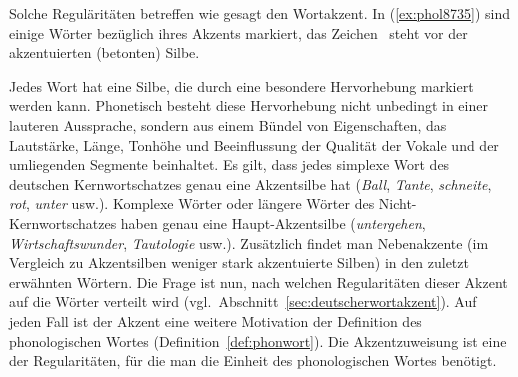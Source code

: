 Solche Reguläritäten betreffen wie gesagt den Wortakzent.
In (\ref{ex:phol8735}) sind einige Wörter bezüglich ihres Akzents markiert, das Zeichen \Akz\ steht vor der akzentuierten (betonten) Silbe.

\begin{exe}
  \ex\label{ex:phol8735}
  \begin{xlist}
  \end{xlist}
\end{exe}

Jedes Wort hat eine Silbe, die durch eine besondere Hervorhebung markiert werden kann.
Phonetisch besteht diese Hervorhebung nicht unbedingt in einer lauteren Aussprache, sondern aus einem Bündel von Eigenschaften, das Lautstärke, Länge, Tonhöhe und Beeinflussung der Qualität der Vokale und der umliegenden Segmente beinhaltet.
Es gilt, dass jedes simplexe Wort des deutschen Kernwortschatzes genau eine Akzentsilbe hat (\textit{\Akz Ball}, \textit{\Akz Tante}, \textit{\Akz schneite}, \textit{\Akz rot}, \textit{\Akz unter} usw.).
Komplexe Wörter oder längere Wörter des Nicht-Kernwortschatzes haben genau eine Haupt-Akzentsilbe (\textit{\Akz untergehen}, \textit{\Akz Wirtschaftswunder}, \textit{Tautolo\Akz gie} usw.).
Zusätzlich findet man Nebenakzente (im Vergleich zu Akzentsilben weniger stark akzentuierte Silben) in den zuletzt erwähnten Wörtern.
Die Frage ist nun, nach welchen Regularitäten dieser Akzent auf die Wörter verteilt wird (vgl.\ Abschnitt~\ref{sec:deutscherwortakzent}).
Auf jeden Fall ist der Akzent eine weitere Motivation der Definition des phonologischen Wortes (Definition~\ref{def:phonwort}).
Die Akzentzuweisung ist eine der Regularitäten, für die man die Einheit des phonologischen Wortes benötigt.


